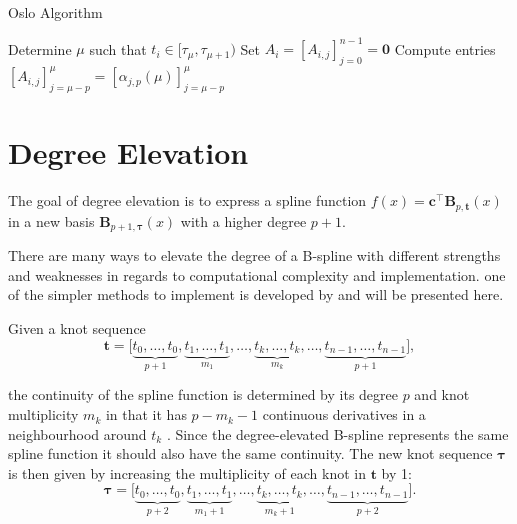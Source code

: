\begin{algorithm}
    \caption{Oslo Algorithm}\label{alg:oslo-knot-insertion}
    \begin{algorithmic}
        \State Determine $\mu$ such that $t_i \in [\tau_\mu, \tau_{\mu+1})$
        \State Set $A_i = [A_{i,j}]_{j=0}^{n-1} = \mathbf 0$
        \State Compute entries $[A_{i,j}]_{j=\mu-p}^\mu = [\alpha_{j,p}(\mu)]_{j=\mu-p}^{\mu}$
        \EndFor
    \end{algorithmic}
\end{algorithm}

\section{Degree Elevation}

The goal of degree elevation is to express a spline function $f(x) = \mathbf{c}^{\top} \mathbf{B}_{p, \mathbf{t}}(x)$ in a new basis $\mathbf{B}_{p+1, \boldsymbol{\tau}}(x)$ with a higher degree $p+1$. 

There are many ways to elevate the degree of a B-spline \citep{piegl1994,Prautzsch1984,lee2000degree} with different strengths and weaknesses in regards to computational complexity and implementation. one of the simpler methods to implement is developed by \cite{Cohen1986} and will be presented here.

Given a knot sequence
\begin{equation}
    \mathbf t = \big[\underbrace{t_0, \ldots, t_0}_{p+1}, \underbrace{t_1, \ldots, t_1}_{m_1}, \ldots, \underbrace{t_k, \ldots, t_k}_{m_k}, \ldots, \underbrace{t_{n-1}, \ldots, t_{n-1}}_{p+1}\big],
\end{equation}

the continuity of the spline function is determined by its degree $p$ and knot multiplicity $m_k$ in that it has $p-m_k-1$ continuous derivatives in a neighbourhood around $t_k$ \citep{Cohen1986}.
Since the degree-elevated B-spline represents the same spline function it should also have the same continuity. The new knot sequence $\boldsymbol \tau$ is then given by increasing the multiplicity of each knot in $\mathbf t$ by 1:
\begin{equation}\label{eq:degree-elevation-knots}
    \boldsymbol \tau = \big[\underbrace{t_0, \ldots, t_0}_{p+2}, \underbrace{t_1, \ldots, t_1}_{m_1+1}, \ldots, \underbrace{t_k, \ldots, t_k}_{m_k+1}, \ldots, \underbrace{t_{n-1}, \ldots, t_{n-1}}_{p+2}\big].
\end{equation}

